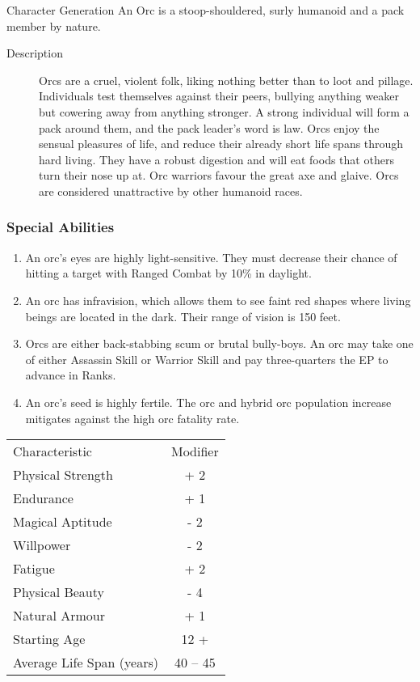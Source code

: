 \begin{Chapter}{Character Generation}
An Orc is a stoop-shouldered, surly humanoid and a pack member by
nature.

\begin{description}
\item[Description] Orcs are a cruel, violent folk, liking nothing
  better than to loot and pillage.  Individuals test themselves
  against their peers, bullying anything weaker but cowering away from
  anything stronger.  A strong individual will form a pack around
  them, and the pack leader’s word is law.  Orcs enjoy the sensual
  pleasures of life, and reduce their already short life spans through
  hard living.  They have a robust digestion and will eat foods that
  others turn their nose up at.  Orc warriors favour the great axe and
  glaive.  Orcs are considered unattractive by other humanoid races.
\end{description}

\subsubsection{Special Abilities}

\begin{enumerate}
  
\item An orc’s eyes are highly light-sensitive.  They must decrease
  their chance of hitting a target with Ranged Combat by 10\% in
  daylight.

\item An orc has infravision, which allows them to see faint red
  shapes where living beings are located in the dark. Their range of
  vision is 150 feet.

\item Orcs are either back-stabbing scum or brutal bully-boys.  An orc
  may take one of either Assassin Skill or Warrior Skill and pay
  three-quarters the EP to advance in Ranks.

\item An orc’s seed is highly fertile.  The orc and hybrid orc
  population increase mitigates against the high orc fatality rate.

\end{enumerate}
  
\begin{tabularx}{\columnwidth}{Xc}
Characteristic 			& Modifier \\
Physical Strength		& + 2 \\
Endurance			& + 1 \\
Magical Aptitude		& - 2 \\
Willpower			& - 2 \\
Fatigue				& + 2 \\
Physical Beauty			& - 4 \\
Natural Armour			& + 1 \\
Starting Age			&  12 + \\
Average Life Span (years)	& 40 -- 45 \\
\end{tabularx}


\end{Chapter}
